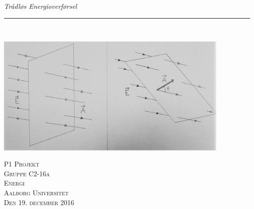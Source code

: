 
\thispagestyle{empty}
\begin{flushright}
\vspace{3cm}

\phantom{hul}

\phantom{hul}

\phantom{hul}

\textsl{\Huge Trådløs Energioverførsel} \\ \vspace{1cm}

\rule{13cm}{3mm} \\ \vspace{1.5cm}
\vspace{1cm}

\includegraphics[width=0.864\textwidth]{Vildledning/Schematics/Vinkelflux}

\vspace{2cm} 
\textsc{\Large P1 Projekt \\
Gruppe C2-16a \\
Energi\\
Aalborg Universitet\\
Den 19. december 2016\\}
\end{flushright}

\newpage
